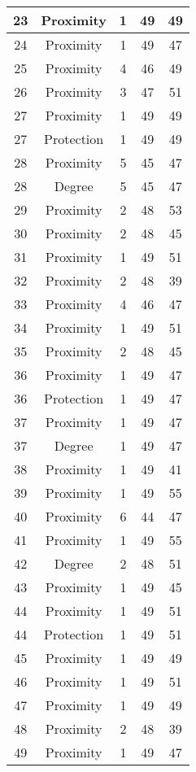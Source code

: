 \documentclass[results.tex]{subfiles}
\begin{document}
\begin{center}
\begin{tabular}{| c || c | c | c | c |}
    \hline
    23 & Proximity & 1 & 49 & 49 \\ 
    \hline
    24 & Proximity & 1 & 49 & 47 \\ 
    \hline
    25 & Proximity & 4 & 46 & 49 \\ 
    \hline
    26 & Proximity & 3 & 47 & 51 \\ 
    \hline
    27 & Proximity & 1 & 49 & 49 \\ 
    \hline
    27 & Protection & 1 & 49 & 49 \\ 
    \hline
    28 & Proximity & 5 & 45 & 47 \\ 
    \hline
    28 & Degree & 5 & 45 & 47 \\ 
    \hline
    29 & Proximity & 2 & 48 & 53 \\ 
    \hline
    30 & Proximity & 2 & 48 & 45 \\ 
    \hline
    31 & Proximity & 1 & 49 & 51 \\ 
    \hline
    32 & Proximity & 2 & 48 & 39 \\ 
    \hline
    33 & Proximity & 4 & 46 & 47 \\ 
    \hline
    34 & Proximity & 1 & 49 & 51 \\ 
    \hline
    35 & Proximity & 2 & 48 & 45 \\ 
    \hline
    36 & Proximity & 1 & 49 & 47 \\ 
    \hline
    36 & Protection & 1 & 49 & 47 \\ 
    \hline
    37 & Proximity & 1 & 49 & 47 \\ 
    \hline
    37 & Degree & 1 & 49 & 47 \\ 
    \hline
    38 & Proximity & 1 & 49 & 41 \\ 
    \hline
    39 & Proximity & 1 & 49 & 55 \\ 
    \hline
    40 & Proximity & 6 & 44 & 47 \\ 
    \hline
    41 & Proximity & 1 & 49 & 55 \\ 
    \hline
    42 & Degree & 2 & 48 & 51 \\ 
    \hline
    43 & Proximity & 1 & 49 & 45 \\ 
    \hline
    44 & Proximity & 1 & 49 & 51 \\ 
    \hline
    44 & Protection & 1 & 49 & 51 \\ 
    \hline
    45 & Proximity & 1 & 49 & 49 \\ 
    \hline
    46 & Proximity & 1 & 49 & 51 \\ 
    \hline
    47 & Proximity & 1 & 49 & 49 \\ 
    \hline
    48 & Proximity & 2 & 48 & 39 \\ 
    \hline
    49 & Proximity & 1 & 49 & 47 \\ 
    \hline   \end{tabular}
\end{center}
\end{document}
